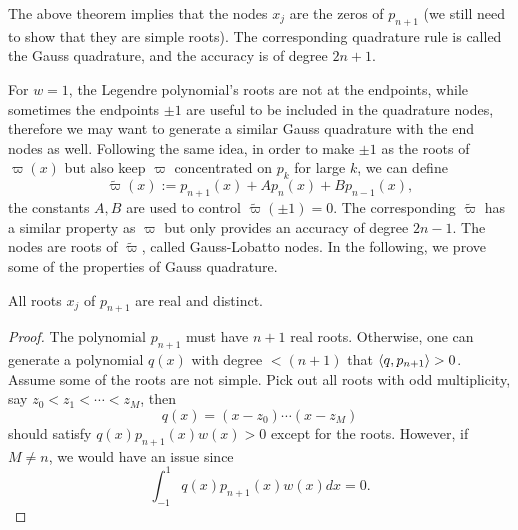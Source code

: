 The above theorem implies that the nodes $x_j$ are the zeros of $p_{n+1}$ (we still need to show that they are simple roots). The corresponding quadrature rule is called the Gauss quadrature, and the accuracy is of degree $2n+1$.

\begin{remark}
    For $w = 1$, the Legendre polynomial's roots are not at the endpoints, while sometimes the endpoints $\pm 1$ are useful to be included in the quadrature nodes, therefore we may want to generate a similar  Gauss quadrature with the end nodes as well. Following the same idea, in order to make $\pm 1$ as the roots of $\varpi(x)$ but also keep $\varpi$ concentrated on $p_{k}$ for large $k$, we can define
    \begin{equation}
        \widetilde{\varpi}(x) := p_{n+1}(x) + A p_n(x)+Bp_{n-1}(x),
     \end{equation}
    the constants $A, B$ are used to control $\widetilde{\varpi}(\pm 1) = 0$. The corresponding $\widetilde{\varpi}$ has a similar property as $\varpi$ but only provides an accuracy of degree $2n - 1$. The nodes are roots of $\widetilde{\varpi}$, called Gauss-Lobatto nodes. In the following, we prove some of the properties of Gauss quadrature. 
\end{remark}

\begin{theorem}
\label{Thm: 3-GAU-ROO-REA-UNI}
    All roots $x_j$ of $p_{n+1}$ are real and distinct.
\end{theorem}
\begin{proof}
    The polynomial $p_{n+1}$ must have $n+1$ real roots. Otherwise, one can generate a polynomial $q(x)$ with degree $<(n+1)$ that $\langle {q, p_{n+1}} \rangle > 0$. Assume some of the roots are not simple. Pick out all roots with odd multiplicity, say $z_0 < z_1 <\cdots < z_M$, then 
    \begin{equation}
        q(x) = (x - z_0)\cdots (x - z_M)
    \end{equation} should satisfy $q(x)p_{n+1}(x) w(x) > 0$ except for the roots. However, if $M\neq n$, we would have an issue since 
    \begin{equation}
        \int_{-1}^1 q(x) p_{n+1}(x)w(x) dx = 0.
    \end{equation}
\end{proof}

